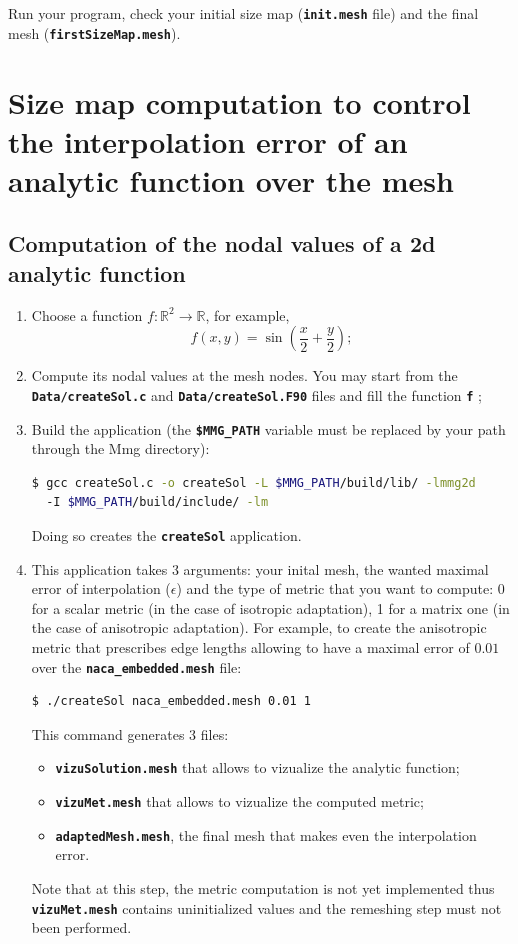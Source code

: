 \documentclass{article}
\newcommand{\ttb}[1]{\texttt{\textbf{#1}}}
\begin{document}
 Run your program, check your initial size map (\ttb{init.mesh} file)
 and the final mesh (\ttb{firstSizeMap.mesh}).\\

\section{Size map computation to control the interpolation error of an analytic function over the mesh\label{error_interp}}

\subsection{Computation of the nodal values of a 2d analytic function}
\begin{enumerate}
\item Choose a function $f : \mathbb{R}^2 \to \mathbb{R}$, for example, 
  $$f(x,y) = \sin\left(\frac{x}{2}+\frac{y}{2}\right);$$
\item Compute its nodal values at the mesh nodes. You may start from
  the \ttb{Data/createSol.c} and \ttb{Data/createSol.F90} files and
  fill the function \ttb{f} ;
\item Build the application (the \ttb{\$MMG\_PATH} variable must be
  replaced by your path through the Mmg directory):
\begin{lstlisting}[language=bash]
$ gcc createSol.c -o createSol -L $MMG_PATH/build/lib/ -lmmg2d
  -I $MMG_PATH/build/include/ -lm
\end{lstlisting}
Doing so creates the \ttb{createSol} application.
\item This application takes 3 arguments: your inital mesh, the wanted
  maximal error of interpolation ($\epsilon$) and the type of metric
  that you want to compute: 0 for a scalar metric (in the case of isotropic adaptation), 1 for a matrix
  one (in the case of anisotropic adaptation). 
  For example, to create the anisotropic metric that prescribes
  edge lengths allowing to have a maximal error of $0.01$ over the
  \ttb{naca\_embedded.mesh} file:
\begin{lstlisting}[language=bash]
  $ ./createSol naca_embedded.mesh 0.01 1
\end{lstlisting}
This command generates 3 files:
\begin{itemize}
\item \ttb{vizuSolution.mesh} that allows to vizualize the analytic function;
\item \ttb{vizuMet.mesh} that allows to vizualize the computed metric;
\item \ttb{adaptedMesh.mesh}, the final mesh that makes even the interpolation error.
\end{itemize}
Note that at this step, the metric computation is not yet implemented
thus \ttb{vizuMet.mesh} contains uninitialized values and the
remeshing step must not been performed.
\end{enumerate}
\end{document}
